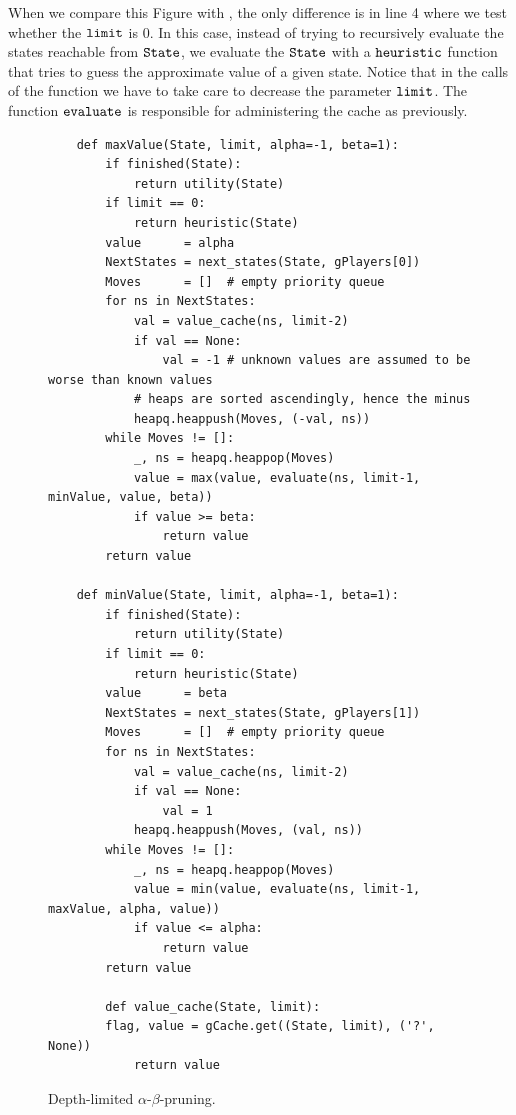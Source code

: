 When we compare this Figure with , the only difference is in line 4
where we test whether the $\texttt{limit}$ is $0$.  In this case, instead of trying to recursively evaluate the
states reachable from $\texttt{State}$, we evaluate the $\texttt{State}$ with a $\texttt{heuristic}$ function
that tries to guess the approximate value of a given state.
Notice that in the calls of the function  we have to take care to decrease the parameter
$\texttt{limit}$.  The function $\texttt{evaluate}$ is responsible for administering the cache as previously.

\begin{figure}[!ht]
\centering
\begin{verbatim}
    def maxValue(State, limit, alpha=-1, beta=1):
        if finished(State):
            return utility(State)
        if limit == 0:
            return heuristic(State)
        value      = alpha
        NextStates = next_states(State, gPlayers[0])
        Moves      = []  # empty priority queue
        for ns in NextStates:
            val = value_cache(ns, limit-2) 
            if val == None:
                val = -1 # unknown values are assumed to be worse than known values
            # heaps are sorted ascendingly, hence the minus
            heapq.heappush(Moves, (-val, ns))
        while Moves != []:
            _, ns = heapq.heappop(Moves)
            value = max(value, evaluate(ns, limit-1, minValue, value, beta))
            if value >= beta:
                return value
        return value
    
    def minValue(State, limit, alpha=-1, beta=1):
        if finished(State):
            return utility(State)
        if limit == 0:
            return heuristic(State)
        value      = beta
        NextStates = next_states(State, gPlayers[1])
        Moves      = []  # empty priority queue
        for ns in NextStates:
            val = value_cache(ns, limit-2)
            if val == None:
                val = 1
            heapq.heappush(Moves, (val, ns))
        while Moves != []:
            _, ns = heapq.heappop(Moves)
            value = min(value, evaluate(ns, limit-1, maxValue, alpha, value))
            if value <= alpha:
                return value
        return value
    
        def value_cache(State, limit):
        flag, value = gCache.get((State, limit), ('?', None))
            return value
\end{verbatim}
\caption{Depth-limited $\alpha$-$\beta$-pruning.}
\label{fig:Game.ipynb}
\end{figure}

